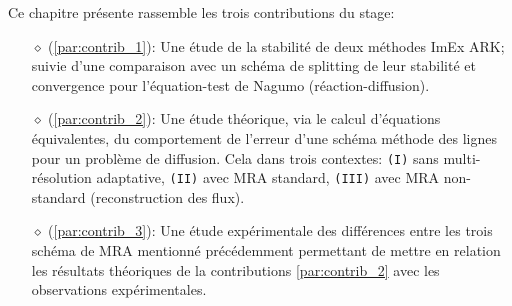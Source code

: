 Ce chapitre présente rassemble les trois contributions du stage:
\begin{itemize}
    \item[$\diamond$] (\ref{par:contrib_1}): Une étude de la stabilité de deux méthodes ImEx ARK;
    suivie d'une comparaison avec un schéma de splitting de leur stabilité et convergence pour l'équation-test de Nagumo (réaction-diffusion).
    \item[$\diamond$] (\ref{par:contrib_2}): Une étude théorique, via le calcul d'équations équivalentes, 
    du comportement de l'erreur d'une schéma méthode des lignes pour un problème de diffusion. 
    Cela dans trois contextes: 
    \texttt{(I)} sans multi-résolution adaptative, 
    \texttt{(II)} avec MRA standard,
    \texttt{(III)} avec MRA non-standard (reconstruction des flux).
    \item[$\diamond$] (\ref{par:contrib_3}): Une étude expérimentale des différences entre les trois schéma de MRA mentionné précédemment 
    permettant de mettre en relation les résultats théoriques de la contributions \ref{par:contrib_2} avec les observations expérimentales.
\end{itemize}